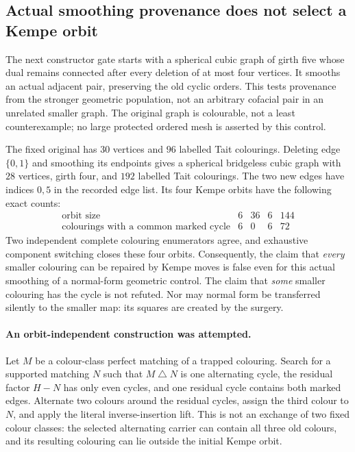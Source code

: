 \subsection{Actual smoothing provenance does not select a Kempe orbit}
\label{sec:smoothing-provenance-gate}

The next constructor gate starts with a spherical cubic graph of girth
five whose dual remains connected after every deletion of at most four
vertices. It smooths an actual adjacent pair, preserving the old cyclic
orders. This tests provenance from the stronger geometric population,
not an arbitrary cofacial pair in an unrelated smaller graph. The
original graph is colourable, not a least counterexample; no large
protected ordered mesh is asserted by this control.

The fixed original has $30$ vertices and $96$ labelled Tait colourings.
Deleting edge $\{0,1\}$ and smoothing its endpoints gives a spherical
bridgeless cubic graph with $28$ vertices, girth four, and $192$ labelled
Tait colourings. The two new edges have indices $0,5$ in the recorded
edge list. Its four Kempe orbits have the following exact counts:
\[
\begin{array}{c|rrrr}
 \text{orbit size} & 6 & 36 & 6 & 144\\
 \text{colourings with a common marked cycle} & 6 & 0 & 6 & 72
\end{array}
\]
Two independent complete colouring enumerators agree, and exhaustive
component switching closes these four orbits. Consequently, the claim
that \emph{every} smaller colouring can be repaired by Kempe moves is
false even for this actual smoothing of a normal-form geometric
control. The claim that \emph{some} smaller colouring has the cycle is
not refuted. Nor may normal form be transferred silently to the
smaller map: its squares are created by the surgery.

\paragraph{An orbit-independent construction was attempted.}
Let $M$ be a colour-class perfect matching of a trapped colouring.
Search for a supported matching $N$ such that $M\mathbin{\triangle}N$
is one alternating cycle, the residual factor $H-N$ has only even
cycles, and one residual cycle contains both marked edges. Alternate
two colours around the residual cycles, assign the third colour to
$N$, and apply the literal inverse-insertion lift. This is not an
exchange of two fixed colour classes: the selected alternating carrier
can contain all three old colours, and its resulting colouring can
lie outside the initial Kempe orbit.

